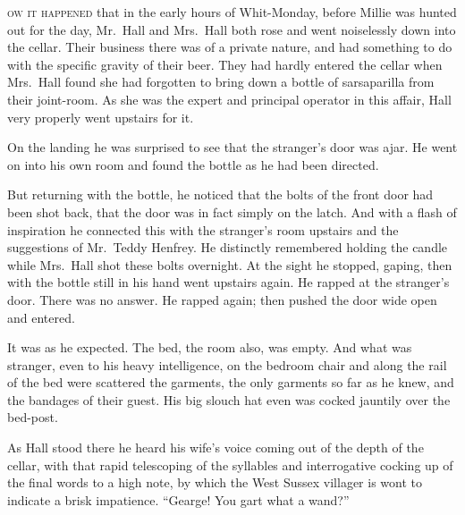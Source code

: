 \label{ch:06}
\begin{ChapterStart}
\vspace*{2\nbs}

\vspace{1.5\nbs}
\vspace{0.75\nbs}
\end{ChapterStart}

\kern-5pt\textsc{ow it happened} that in the early hours of Whit-Monday, before Millie was hunted out for the day, Mr.\ Hall and Mrs.\ Hall both rose and went noiselessly down into the cellar. Their business there was of a private nature, and had something to do with the specific gravity of their beer. They had hardly entered the cellar when Mrs.\ Hall found she had forgotten to bring down a bottle of sarsaparilla from their joint-room. As she was the expert and principal operator in this affair, Hall very properly went upstairs for it.

On the landing he was surprised to see that the stranger’s door was ajar. He went on into his own room and found the bottle as he had been directed.

But returning with the bottle, he noticed that the bolts of the front door had been shot back, that the door was in fact simply on the latch. And with a flash of inspiration he connected this with the stranger’s room upstairs and the suggestions of Mr.\ Teddy Henfrey. He distinctly remembered holding the candle while Mrs.\ Hall shot these bolts overnight. At the sight he stopped, gaping, then with the bottle still in his hand went upstairs again. He rapped at the stranger’s door. There was no answer. He rapped again; then pushed the door wide open and entered.

It was as he expected. The bed, the room also, was empty. And what was stranger, even to his heavy intelligence, on the bedroom chair and along the rail of the bed were scattered the garments, the only garments so far as he knew, and the bandages of their guest. His big slouch hat even was cocked jauntily over the bed-post.

As Hall stood there he heard his wife’s voice coming out of the depth of the cellar, with that rapid telescoping of the syllables and interrogative cocking up of the final words to a high note, by which the West Sussex villager is wont to indicate a brisk impatience. “Gearge! You gart what a wand?”

